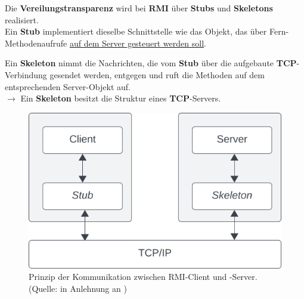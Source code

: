 \noindent
Die \textbf{Vereilungstransparenz} wird bei \textbf{RMI} über \textbf{Stubs} und \textbf{Skeletons} realisiert.\\

\noindent
Ein \textbf{Stub} implementiert dieselbe Schnittstelle wie das Objekt, das über Fern-Methodenaufrufe \ul{auf dem Server gesteuert werden soll}.

\noindent
Ein \textbf{Skeleton} nimmt die Nachrichten, die vom \textbf{Stub} über die aufgebaute \textbf{TCP}-Verbindung gesendet werden, entgegen und ruft die Methoden auf dem entsprechenden Server-Objekt auf.\\
$\rightarrow$ Ein \textbf{Skeleton} besitzt die Struktur eines \textbf{TCP}-Servers.

\begin{figure}
    \centering
    \includegraphics[scale=0.4]{chapters/fopt5/img/rmi/stubskeleton}
    \caption{Prinzip der Kommunikation zwischen RMI-Client und -Server. (Quelle: in Anlehnung an \cite[312, Bild 6.3]{Oec22})}
    \label{fig:stubskeleton}
\end{figure}

